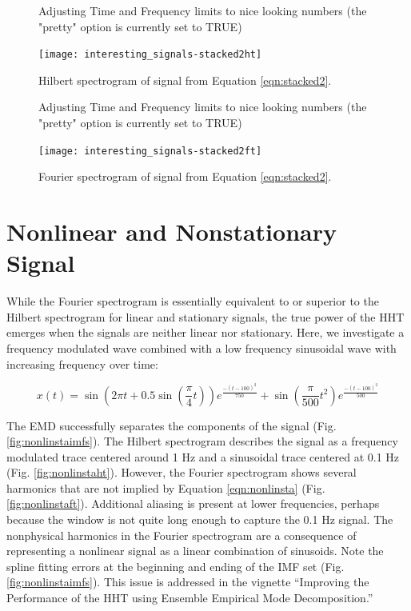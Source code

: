 \documentclass[12pt]{article}
\begin{document}
\begin{figure}[ht]
\begin{center}
\begin{Schunk}
\begin{Soutput}
Adjusting Time and Frequency limits to nice looking numbers (the "pretty" option is currently set to TRUE)
\end{Soutput}
\end{Schunk}
\texttt{[image: interesting\_signals-stacked2ht]}
\end{center}
\caption{Hilbert spectrogram of signal from Equation \ref{eqn:stacked2}.}
\label{fig:stacked2ht}
\end{figure}

\begin{figure}[ht]
\begin{center}
\begin{Schunk}
\begin{Soutput}
Adjusting Time and Frequency limits to nice looking numbers (the "pretty" option is currently set to TRUE)
\end{Soutput}
\end{Schunk}
\texttt{[image: interesting\_signals-stacked2ft]}
\end{center}
\caption{Fourier spectrogram of signal from Equation \ref{eqn:stacked2}.}
\label{fig:stacked2ft}
\end{figure}

\FloatBarrier

\section{Nonlinear and Nonstationary Signal}
While the Fourier spectrogram is essentially equivalent to or superior to the Hilbert spectrogram for linear and stationary signals,
the true power of the HHT emerges when the signals are neither linear nor stationary.
Here, we investigate a frequency modulated wave combined with a low frequency sinusoidal wave with increasing frequency over time:

\begin{equation}
\label{eqn:nonlinsta}
x (t) = \sin(2\pi t+0.5\sin(\frac{\pi}{4} t))e^{\frac{-(t-100)^{2}}{750}} + \sin(\frac{\pi}{500} t^{2})e^{\frac{-(t-100)^{2}}{500}}
\end{equation}

The EMD successfully separates the components of the signal (Fig. \ref{fig:nonlinstaimfs}).
The Hilbert spectrogram describes the signal as a frequency modulated trace centered around 1 Hz and a 
sinusoidal trace centered at 0.1 Hz (Fig. \ref{fig:nonlinstaht}).
However, the Fourier spectrogram shows several harmonics that are not implied by Equation \ref{eqn:nonlinsta} (Fig. \ref{fig:nonlinstaft}).
Additional aliasing is present at lower frequencies, perhaps because the window is not quite long enough to capture the 0.1 Hz signal.
The nonphysical harmonics in the Fourier spectrogram are a consequence of representing a nonlinear signal as a linear combination of sinusoids.
Note the spline fitting errors at the beginning and ending of the IMF set (Fig. \ref{fig:nonlinstaimfs}).
This issue is addressed in the vignette ``Improving the Performance of the HHT using Ensemble Empirical Mode Decomposition.''
\end{document}
